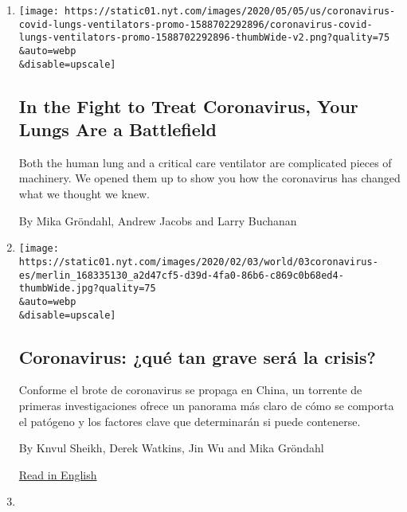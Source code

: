 \begin{enumerate}
\def\labelenumi{\arabic{enumi}.}
\item
  \href{/interactive/2020/05/08/health/coronavirus-covid-lungs-ventilators.html}{}

  \texttt{[image: https://static01.nyt.com/images/2020/05/05/us/coronavirus-covid-lungs-ventilators-promo-1588702292896/coronavirus-covid-lungs-ventilators-promo-1588702292896-thumbWide-v2.png?quality=75\\\&auto=webp\\\&disable=upscale]}

  \hypertarget{in-the-fight-to-treat-coronavirus-your-lungs-are-a-battlefield}{%
  \subsection{In the Fight to Treat Coronavirus, Your Lungs Are a
  Battlefield}\label{in-the-fight-to-treat-coronavirus-your-lungs-are-a-battlefield}}

  Both the human lung and a critical care ventilator are complicated
  pieces of machinery. We opened them up to show you how the coronavirus
  has changed what we thought we knew.

  By Mika Gröndahl, Andrew Jacobs and Larry Buchanan
\item
  \href{/es/2020/02/04/espanol/mundo/coronavirus-vacuna-viaje.html}{}

  \texttt{[image: https://static01.nyt.com/images/2020/02/03/world/03coronavirus-es/merlin\_168335130\_a2d47cf5-d39d-4fa0-86b6-c869c0b68ed4-thumbWide.jpg?quality=75\\\&auto=webp\\\&disable=upscale]}

  \hypertarget{coronavirus-quuxe9-tan-grave-seruxe1-la-crisis}{%
  \subsection{Coronavirus: ¿qué tan grave será la
  crisis?}\label{coronavirus-quuxe9-tan-grave-seruxe1-la-crisis}}

  Conforme el brote de coronavirus se propaga en China, un torrente de
  primeras investigaciones ofrece un panorama más claro de cómo se
  comporta el patógeno y los factores clave que determinarán si puede
  contenerse.

  By Knvul Sheikh, Derek Watkins, Jin Wu and Mika Gröndahl

  \href{https://www.nytimes.com/interactive/2020/world/asia/china-coronavirus-contain.html}{Read
  in English}
\item
  \href{/interactive/2020/world/asia/china-coronavirus-contain.html}{}


\end{enumerate}
